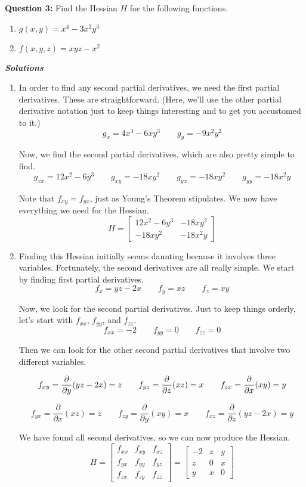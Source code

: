 \documentclass[10pt]{amsart}
\begin{document}
\textbf{Question 3:} Find the Hessian $H$ for the following functions. 
\begin{enumerate}
	\item $g(x,y) = x^4 - 3x^2 y^3$
	\item $f(x,y,z) = xyz - x^2$
\end{enumerate}

\textbf{\textit{Solutions}}
\begin{enumerate}
	\item In order to find any second partial derivatives, we need the first partial derivatives. These are straightforward. (Here, we'll use the other partial derivative notation just to keep things interesting and to get you accustomed to it.)
	$$g_x = 4x^3 - 6xy^3 \qquad g_y = -9x^2y^2$$
	
	Now, we find the second partial derivatives, which are also pretty simple to find.
	$$g_{xx} = 12x^2 - 6y^3 \qquad g_{xy} = -18xy^2 \qquad g_{yx} = -18xy^2 \qquad g_{yy} = -18x^2y$$
	
	Note that $f_{xy} = f_{yx}$, just as Young's Theorem stipulates. We now have everything we need for the Hessian.
	$$H = \left[\begin{array}{rr}
	12x^2 - 6y^3 & -18xy^2 \\
	-18xy^2 & -18x^2y
	\end{array}\right]$$
	
	\item Finding this Hessian initially seems daunting because it involves three variables. Fortunately, the second derivatives are all really simple. We start by finding first partial derivatives. 
	$$f_{x} = yz-2x \qquad f_{y} = xz \qquad f_{z} = xy$$
	
	Now, we look for the second partial derivatives. Just to keep things orderly, let's start with $f_{xx}$, $f_{yy}$, and $f_{zz}$.
	$$f_{xx} = -2 \qquad f_{yy} = 0 \qquad f_{zz} = 0$$
	
	Then we can look for the other second partial derivatives that involve two different variables.
	
	$$
	f_{xy} = \frac{\partial}{\partial y} (yz-2x) = z \qquad f_{yz} = \frac{\partial}{\partial z} (xz) = x \qquad f_{zx} = \frac{\partial}{\partial x} (xy) = y\\$$ 
	
	$$f_{yx} = \frac{\partial}{\partial x} (xz) = z \qquad f_{zy} = \frac{\partial}{\partial y} (xy) = x \qquad f_{xz} = \frac{\partial}{\partial z} (yz-2x) = y
	$$
	
	We have found all second derivatives, so we can now produce the Hessian.
	\medskip
	\begin{equation*}
	H = \left[\begin{array}{rrr}
	f_{xx} & f_{xy} & f_{xz}\\
	f_{yx} & f_{yy} & f_{yz}\\
	f_{zx} & f_{zy} & f_{zz}\end{array}\right]
	=
	\left[\begin{array}{rrr}
	-2 & z & y\\
	z & 0 & x\\
	y & x & 0
	\end{array}\right]
	\end{equation*}
\end{enumerate}
\end{document}
